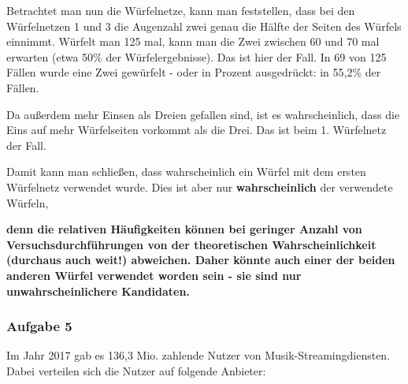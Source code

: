 \documentclass[
  ngerman,
]{book}
\begin{document}
Betrachtet man nun die Würfelnetze, kann man feststellen, dass bei den Würfelnetzen 1 und 3 die Augenzahl zwei genau die Hälfte der Seiten des Würfels einnimmt. Würfelt man 125 mal, kann man die Zwei zwischen 60 und 70 mal erwarten (etwa 50\% der Würfelergebnisse). Das ist hier der Fall. In 69 von 125 Fällen wurde eine Zwei gewürfelt - oder in Prozent ausgedrückt: in 55,2\% der Fällen.

Da außerdem mehr Einsen als Dreien gefallen sind, ist es wahrscheinlich, dass die Eins auf mehr Würfelseiten vorkommt als die Drei. Das ist beim 1. Würfelnetz der Fall.

Damit kann man schließen, dass wahrscheinlich ein Würfel mit dem ersten Würfelnetz verwendet wurde. Dies ist aber nur \textbf{wahrscheinlich} der verwendete Würfeln,

\textbf{denn die relativen Häufigkeiten können bei geringer Anzahl von Versuchsdurchführungen von der theoretischen Wahrscheinlichkeit (durchaus auch weit!) abweichen. Daher könnte auch einer der beiden anderen Würfel verwendet worden sein - sie sind nur unwahrscheinlichere Kandidaten.}

\hypertarget{section-82}{%
\subsubsection*{}\label{section-82}}

\hypertarget{aufgabe-5}{%
\subsubsection*{Aufgabe 5}\label{aufgabe-5}}

Im Jahr 2017 gab es 136,3 Mio. zahlende Nutzer von Musik-Streamingdiensten. Dabei verteilen sich die Nutzer auf folgende Anbieter:
\end{document}

